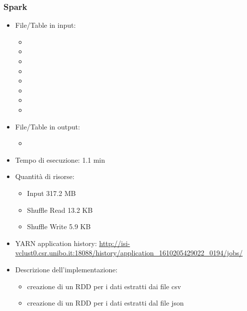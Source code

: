 \documentclass[10pt]{article}
\begin{document}
\subsubsection{Spark}
\begin{itemize}
    \item File/Table in input:
    \begin{itemize}
        \item {}
        \item {}
        \item {}
        \item {}
        \item {}
        \item {}
        \item {}
        \item {}
    \end{itemize}
    \item File/Table in output:
    \begin{itemize}
        \item {}
    \end{itemize}
    \item Tempo di esecuzione: 1.1 min
    \item Quantità di risorse:
        \begin{itemize}
            \item Input 317.2 MB
            \item Shuffle Read 13.2 KB
            \item Shuffle Write 5.9 KB
        \end{itemize}
    \item YARN application history: \url{http://isi-vclust0.csr.unibo.it:18088/history/application_1610205429022_0194/jobs/}
    \item Descrizione dell'implementazione:
        \begin{itemize}
            \item creazione di un RDD per i dati estratti dai file csv
            \item creazione di un RDD per i dati estratti dal file json

\end{itemize}
\end{itemize}
\end{document}
